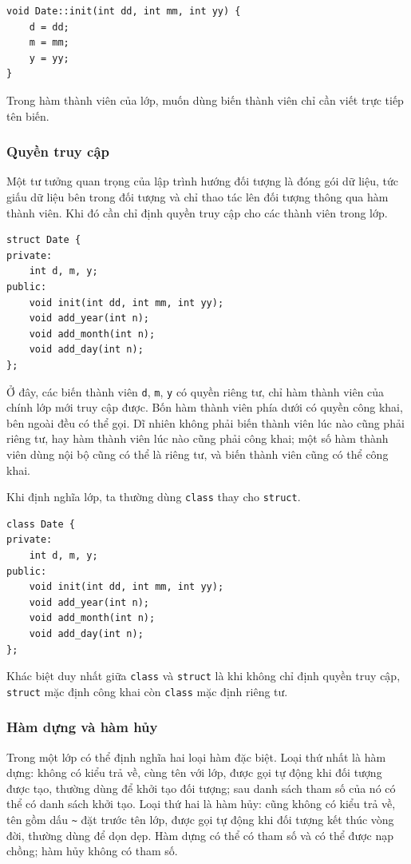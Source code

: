 \documentclass[11pt]{article}
\begin{document}
\begin{verbatim}
void Date::init(int dd, int mm, int yy) {
    d = dd;
    m = mm;
    y = yy;
}
\end{verbatim}

Trong hàm thành viên của lớp, muốn dùng biến thành viên chỉ cần viết trực
tiếp tên biến.

\subsubsection*{Quyền truy cập}

Một tư tưởng quan trọng của lập trình hướng đối tượng là đóng gói dữ liệu,
tức giấu dữ liệu bên trong đối tượng và chỉ thao tác lên đối tượng thông qua
hàm thành viên. Khi đó cần chỉ định quyền truy cập cho các thành viên trong
lớp.

\begin{verbatim}
struct Date {
private:
    int d, m, y;
public:
    void init(int dd, int mm, int yy);
    void add_year(int n);
    void add_month(int n);
    void add_day(int n);
};
\end{verbatim}

Ở đây, các biến thành viên \verb|d|, \verb|m|, \verb|y| có quyền riêng tư,
chỉ hàm thành viên của chính lớp mới truy cập được. Bốn hàm thành viên phía
dưới có quyền công khai, bên ngoài đều có thể gọi. Dĩ nhiên không phải biến
thành viên lúc nào cũng phải riêng tư, hay hàm thành viên lúc nào cũng phải
công khai; một số hàm thành viên dùng nội bộ cũng có thể là riêng tư, và biến
thành viên cũng có thể công khai.

Khi định nghĩa lớp, ta thường dùng \verb|class| thay cho \verb|struct|.

\begin{verbatim}
class Date {
private:
    int d, m, y;
public:
    void init(int dd, int mm, int yy);
    void add_year(int n);
    void add_month(int n);
    void add_day(int n);
};
\end{verbatim}

Khác biệt duy nhất giữa \verb|class| và \verb|struct| là khi không chỉ định
quyền truy cập, \verb|struct| mặc định công khai còn \verb|class| mặc định
riêng tư.

\subsubsection*{Hàm dựng và hàm hủy}

Trong một lớp có thể định nghĩa hai loại hàm đặc biệt. Loại thứ nhất là hàm
dựng: không có kiểu trả về, cùng tên với lớp, được gọi tự động khi đối tượng
được tạo, thường dùng để khởi tạo đối tượng; sau danh sách tham số của nó có
thể có danh sách khởi tạo. Loại thứ hai là hàm hủy: cũng không có kiểu trả
về, tên gồm dấu \verb|~| đặt trước tên lớp, được gọi tự động khi đối tượng kết
thúc vòng đời, thường dùng để dọn dẹp. Hàm dựng có thể có tham số và có thể
được nạp chồng; hàm hủy không có tham số.
\end{document}
